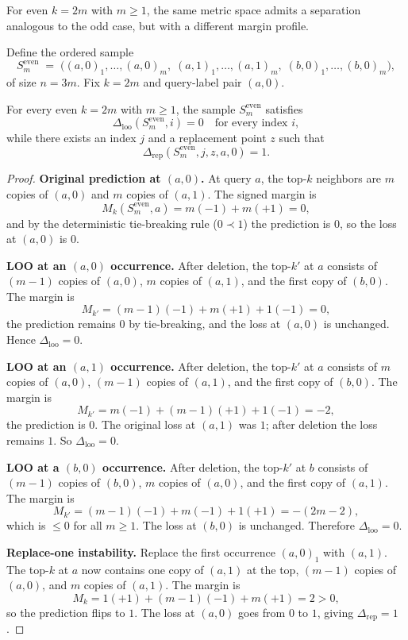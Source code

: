 For even $k = 2m$ with $m \ge 1$, the same metric space admits a separation
analogous to the odd case, but with a different margin profile.

Define the ordered sample
\[
S_m^{\text{even}} \;=\; \big((a,0)_1,\ldots,(a,0)_m,\;
                            (a,1)_1,\ldots,(a,1)_m,\;
                            (b,0)_1,\ldots,(b,0)_m\big),
\]
of size $n = 3m$. Fix $k = 2m$ and query-label pair $(a,0)$.

\begin{theorem}
\label{thm:even-k-separation}
For every even $k = 2m$ with $m \ge 1$, the sample $S_m^{\text{even}}$
satisfies
\[
\Delta_{\mathrm{loo}}(S_m^{\text{even}}, i) = 0 \quad \text{for every index } i,
\]
while there exists an index $j$ and a replacement point $z$ such that
\[
\Delta_{\mathrm{rep}}(S_m^{\text{even}}, j, z, a, 0) = 1.
\]
\end{theorem}

\begin{proof}
\textbf{Original prediction at $(a,0)$.} At query $a$, the top-$k$ neighbors are
$m$ copies of $(a,0)$ and $m$ copies of $(a,1)$. The signed margin is
\[
M_k(S_m^{\text{even}}, a) = m(-1) + m(+1) = 0,
\]
and by the deterministic tie-breaking rule ($0 \prec 1$) the prediction is $0$,
so the loss at $(a,0)$ is $0$.

\textbf{LOO at an $(a,0)$ occurrence.} After deletion, the top-$k'$ at $a$
consists of $(m-1)$ copies of $(a,0)$, $m$ copies of $(a,1)$, and the first
copy of $(b,0)$. The margin is
\[
M_{k'} = (m-1)(-1) + m(+1) + 1(-1) = 0,
\]
the prediction remains $0$ by tie-breaking, and the loss at $(a,0)$ is
unchanged. Hence $\Delta_{\mathrm{loo}} = 0$.

\textbf{LOO at an $(a,1)$ occurrence.} After deletion, the top-$k'$ at $a$
consists of $m$ copies of $(a,0)$, $(m-1)$ copies of $(a,1)$, and the first
copy of $(b,0)$. The margin is
\[
M_{k'} = m(-1) + (m-1)(+1) + 1(-1) = -2,
\]
the prediction is $0$. The original loss at $(a,1)$ was $1$; after deletion the
loss remains $1$. So $\Delta_{\mathrm{loo}} = 0$.

\textbf{LOO at a $(b,0)$ occurrence.} After deletion, the top-$k'$ at $b$
consists of $(m-1)$ copies of $(b,0)$, $m$ copies of $(a,0)$, and the first
copy of $(a,1)$. The margin is
\[
M_{k'} = (m-1)(-1) + m(-1) + 1(+1) = -(2m-2),
\]
which is $\le 0$ for all $m \ge 1$. The loss at $(b,0)$ is unchanged.
Therefore $\Delta_{\mathrm{loo}} = 0$.

\textbf{Replace-one instability.} Replace the first occurrence $(a,0)_1$ with
$(a,1)$. The top-$k$ at $a$ now contains one copy of $(a,1)$ at the top,
$(m-1)$ copies of $(a,0)$, and $m$ copies of $(a,1)$. The margin is
\[
M_k = 1(+1) + (m-1)(-1) + m(+1) = 2 > 0,
\]
so the prediction flips to $1$. The loss at $(a,0)$ goes from $0$ to $1$,
giving $\Delta_{\mathrm{rep}} = 1$.
\end{proof}

